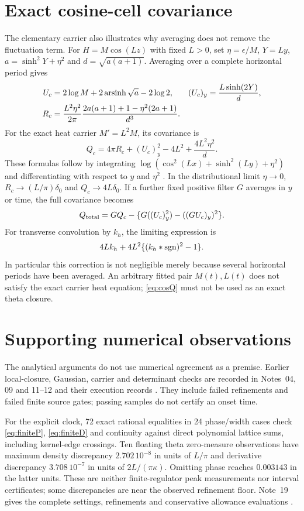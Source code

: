 \section{Exact cosine-cell covariance}\label{app:cosine}
The elementary carrier also illustrates why averaging does not remove
the fluctuation term. For $H=M\cos(Lz)$ with fixed $L>0$,
set $\eta=\epsilon/M$, $Y=Ly$, $a=\sinh^2Y+\eta^2$ and
$d=\sqrt{a(a+1)}$. Averaging over a complete horizontal period gives
\begin{align}
 U_c&=2\log M+2\operatorname{arsinh}\sqrt a-2\log2,&
 (U_c)_y&=\frac{L\sinh(2Y)}d,\notag\\
 R_c&=\frac{L^2\eta^2}{2\pi}
 \frac{2a(a+1)+1-\eta^2(2a+1)}{d^3}. \label{eq:cosmean}
\end{align}
For the exact heat carrier $M'=L^2M$, its covariance is
\begin{equation}
 Q_c=4\pi R_c+(U_c)_y^2-4L^2+\frac{4L^2\eta^2}{d}.
 \label{eq:cosQ}
\end{equation}
These formulas follow by integrating
$\log(\cos^2(Lx)+\sinh^2(Ly)+\eta^2)$ and differentiating with
respect to $y$ and $\eta^2$ \cite{n05}.
In the distributional limit $\eta\to0$,
$R_c\to(L/\pi)\delta_0$ and $Q_c\to4L\delta_0$.
If a further fixed positive filter $G$ averages in $y$ or time,
the full covariance becomes
\begin{equation}
 Q_{\rm total}=GQ_c-
 \{G((U_c)_y^2)-((GU_c)_y)^2\}.
 \label{eq:secondcov}
\end{equation}
For transverse convolution by $k_h$, the limiting expression is
\[
 4Lk_h+4L^2\{(k_h*\operatorname{sgn})^2-1\}.
\]
In particular this correction is not negligible merely because several
horizontal periods have been averaged. An arbitrary fitted pair
$M(t),L(t)$ does not satisfy the exact carrier heat equation;
\eqref{eq:cosQ} must not be used as an exact theta closure.

\section{Supporting numerical observations}\label{app:numerics}
The analytical arguments do not use numerical agreement as a premise.
Earlier local-closure, Gaussian, carrier and determinant checks are
recorded in Notes~04, 09 and 11--12 and their execution records
\cite{round1,round2,round3}. They include failed refinements and failed
finite source gates; passing samples do not certify an onset time.

For the explicit clock, 72 exact rational equalities in 24 phase/width
cases check \eqref{eq:finiteP}, \eqref{eq:finiteD} and continuity against
direct polynomial lattice sums, including kernel-edge crossings.
Ten floating theta zero-measure observations have maximum density
discrepancy $2.702\,10^{-8}$ in units of $L/\pi$ and derivative
discrepancy $3.708\,10^{-7}$ in units of $2L/(\pi\kappa)$.
Omitting phase reaches $0.003143$ in the latter units.
These are neither finite-regulator peak measurements nor interval
certificates; some discrepancies are near the observed refinement floor.
Note~19 gives the complete settings, refinements and conservative
allowance evaluations \cite{n19,explicitrecord}.

